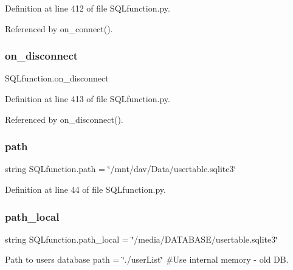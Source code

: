 Definition at line 412 of file S\+Q\+Lfunction.\+py.



Referenced by on\+\_\+connect().

\mbox{\label{namespace_s_q_lfunction_ab3031ccbbdb3f5a04bd7d66ceb4494c7}} 
\subsubsection{\texorpdfstring{on\+\_\+disconnect}{on\_disconnect}}
{\footnotesize\ttfamily S\+Q\+Lfunction.\+on\+\_\+disconnect}



Definition at line 413 of file S\+Q\+Lfunction.\+py.



Referenced by on\+\_\+disconnect().

\mbox{\label{namespace_s_q_lfunction_a9239421845b9e0921bad7a2a191f3849}} 
\subsubsection{\texorpdfstring{path}{path}}
{\footnotesize\ttfamily string S\+Q\+Lfunction.\+path = \char`\"{}/mnt/dav/Data/usertable.\+sqlite3\char`\"{}}



Definition at line 44 of file S\+Q\+Lfunction.\+py.

\mbox{\label{namespace_s_q_lfunction_a50744e6ca7c6cbd547746acb907f016e}} 
\subsubsection{\texorpdfstring{path\+\_\+local}{path\_local}}
{\footnotesize\ttfamily string S\+Q\+Lfunction.\+path\+\_\+local = \char`\"{}/media/D\+A\+T\+A\+B\+A\+SE/usertable.\+sqlite3\char`\"{}}



Path to users database path = \char`\"{}./user\+List\char`\"{} \#\+Use internal memory -\/ old DB. 



